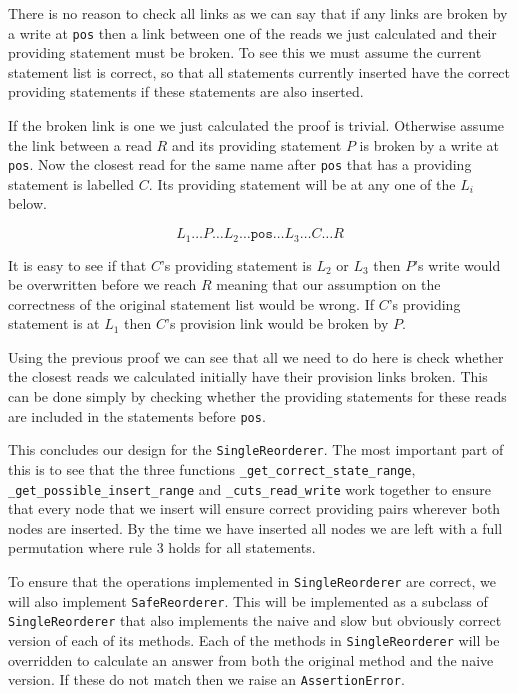 \documentclass[twoside,a4paper]{report}
\begin{document}
\begin{description}
There is no reason to check all links as we can say that if any links are broken by a write at \texttt{pos} then a link between one of the reads we just
calculated and their providing statement must be broken. To see this we must assume the current statement list is correct, so that all statements currently
inserted have the correct providing statements if these statements are also inserted.

If the broken link is one we just calculated the proof is trivial. Otherwise assume the link between a read $R$ and its providing statement $P$ is broken
by a write at \texttt{pos}. Now the closest read for the same name after \texttt{pos} that has a providing statement is labelled $C$. Its providing
statement will be at any one of the $L_i$ below.

$$L_1 \ldots P \ldots L_2 \ldots \mathtt{pos} \ldots L_3 \ldots C \ldots R$$

It is easy to see if that $C$'s providing statement is $L_2$ or $L_3$ then $P$'s write would be overwritten before we reach $R$ meaning that our assumption
on the correctness of the original statement list would be wrong. If $C$'s providing statement is at $L_1$ then $C$'s provision link would be broken by $P$.

Using the previous proof we can see that all we need to do here is check whether the closest reads we calculated initially have their provision links broken.
This can be done simply by checking whether the providing statements for these reads are included in the statements before \texttt{pos}.

\end{description}

This concludes our design for the \texttt{SingleReorderer}. The most important part of this is to see that the three functions
\texttt{\_get\_correct\_state\_range}, \texttt{\_get\_possible\_insert\_range} and \texttt{\_cuts\_read\_write} work together to ensure that every node that
we insert will ensure correct providing pairs wherever both nodes are inserted. By the time we have inserted all nodes we are left with a full permutation
where rule 3 holds for all statements.

To ensure that the operations implemented in \texttt{SingleReorderer} are correct, we will also implement \texttt{SafeReorderer}. This will be implemented
as a subclass of \texttt{SingleReorderer} that also implements the naive and slow but obviously correct version of each of its methods. Each of the methods
in \texttt{SingleReorderer} will be overridden to calculate an answer from both the original method and the naive version. If these do not match then we
raise an \texttt{AssertionError}.
\end{document}
